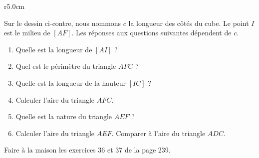 
\begin{exercice}\label{exosmath-0115}

\begin{wrapfigure}{r}{5.0cm}
   \vspace{-0.5cm}        %
   \centering
   
\end{wrapfigure}

    Sur le dessin ci-contre, nous nommons \( c\) la longueur des côtés du cube. Le point \( I\) est le milieu de \( [AF]\). Les réponses aux questions suivantes dépendent de \( c\).

        \begin{enumerate}
            \item
                Quelle est la longueur de \( [AI]\) ?
            \item
                Quel est le périmètre du triangle \( AFC\) ?
            \item
                Quelle est la longueur de la hauteur \( [IC]\) ?
            \item
                Calculer l'aire du triangle \( AFC\).
            \item
                Quelle est la nature du triangle \( AEF\) ?
            \item
                Calculer l'aire du triangle \( AEF\). Comparer à l'aire du triangle \( ADC\).
        \end{enumerate}

        Faire à la maison les exercices 36 et 37 de la page 239.

\end{exercice}
